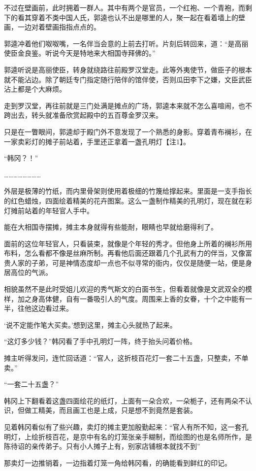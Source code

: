不过在壁画前，此时拥着一群人。其中有两个是官员，一个红袍、一个青袍，而剩下的看其穿着不类中国人氏，郭逵也认不出是哪里的人，聚一起在看着墙上的壁画，一边对着壁画指指点点的。

郭逵冲着他们呶呶嘴，一名伴当会意的上前去打听。片刻后转回来，道：“是高丽使臣金良鉴。听说今天是特地来大相国寺拜佛的。”

郭逵听说是高丽使臣，转身就绕路往前殿罗汉堂走。此等外夷使节，做臣子的根本就不能沾边。除了朝廷专门指定随行陪伴的馆伴使，否则瓜田李下之嫌，文臣武臣沾上都是个大麻烦。

走到罗汉堂，再往前就是三门处满是摊点的广场，郭逵本来就不怎么喜喧闹，也不跨出去，转头就准备欣赏起殿中的五百尊金罗汉来。

只是在一瞥眼间，郭逵却于殿门外不意发现了一个熟悉的身影。穿着青布襕衫，在一家卖彩灯的摊子前站着，手里还正拿着一盏孔明灯【注1】。

“韩冈？！”

……………………

外层是极薄的竹纸，而内里骨架则使用着极细的竹篾给撑起来。里面是一支手指长的红色蜡烛，四面绘着精美的花卉图案。这么一盏制作精美的孔明灯，现在就在彩灯摊前站着的年轻官人手中。

能在大相国寺摆摊，摊主本身就得有些能耐，眼睛也早就给磨得利了。

面前的这位年轻官人，只看装束，就像是个年轻的秀才。但他身上所着的襕衫所用布料，怎么看都不像是丝麻所制。再看他后面还跟着几个孔武有力的伴当，又像富贵人家的子弟，可是神情态度却一点也不似寻常的衙内，仅仅是随便一站，便是身居高位的气派。

相貌虽然不是此时受姐儿欢迎的秀气斯文的白面书生，但看着就像是文武双全的模样，加之身高体健，自有一番吸引人的气度。周围来上香的女眷，十个之中能有一半，往他这边看过来。

‘说不定能作笔大买卖。’想到这里，摊主心头就热了起来。

“这灯多少钱？”韩冈看了手中孔明灯一阵，终于抬头问着价格。

摊主听得发问，连忙回话道：“官人，这折枝百花灯一套二十五盏，只整卖，不单卖。”

“一套二十五盏？”

韩冈上下翻看着这盏四面绘花的纸灯，上面有一朵合欢，一朵栀子，还有两朵不认识，但做工精美，而且画工也是上成，只是想不到竟然是套装。

见着韩冈看似有了些兴趣，卖灯的摊主更加殷勤起来：“官人有所不知，这一套孔明灯，上绘折枝百花，是京中有名的灯笼张亲手糊制，而绘图的也是名师所作，是陈待诏的亲传弟子。只有小人摊子上有，别家店铺根本就找不到”

那卖灯一边推销着，一边指着灯笼一角给韩冈看，的确能看到鲜红的印记。

